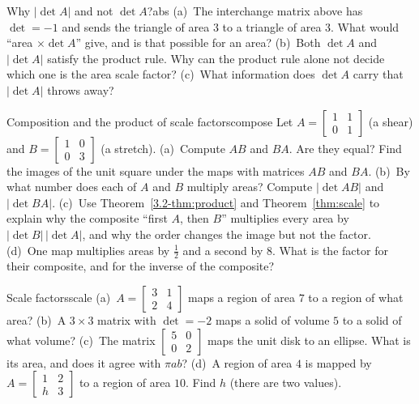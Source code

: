 \documentclass[11pt]{article}
\begin{document}
\begin{think}{Why $|\det A|$ and not $\det A$?}{abs}
(a)~The interchange matrix above has $\det=-1$ and sends the triangle of area $3$ to a triangle of area $3$. What would ``area $\times\det A$'' give, and is that possible for an area? (b)~Both $\det A$ and $|\det A|$ satisfy the product rule. Why can the product rule alone not decide which one is the area scale factor? (c)~What information does $\det A$ carry that $|\det A|$ throws away?
\end{think}

\begin{think}{Composition and the product of scale factors}{compose}
Let $A=\begin{bmatrix}1&1\\0&1\end{bmatrix}$ (a shear) and $B=\begin{bmatrix}1&0\\0&3\end{bmatrix}$ (a stretch). (a)~Compute $AB$ and $BA$. Are they equal? Find the images of the unit square under the maps with matrices $AB$ and $BA$. (b)~By what number does each of $A$ and $B$ multiply areas? Compute $|\det AB|$ and $|\det BA|$. (c)~Use Theorem~\ref{3.2-thm:product} and Theorem~\ref{thm:scale} to explain why the composite ``first $A$, then $B$'' multiplies every area by $|\det B|\,|\det A|$, and why the order changes the image but not the factor. (d)~One map multiplies areas by $\tfrac12$ and a second by $8$. What is the factor for their composite, and for the inverse of the composite?
\end{think}

\begin{kc}{Scale factors}{scale}
(a)~$A=\begin{bmatrix}3&1\\2&4\end{bmatrix}$ maps a region of area $7$ to a region of what area? (b)~A $3\times3$ matrix with $\det=-2$ maps a solid of volume $5$ to a solid of what volume? (c)~The matrix $\begin{bmatrix}5&0\\0&2\end{bmatrix}$ maps the unit disk to an ellipse. What is its area, and does it agree with $\pi ab$? (d)~A region of area $4$ is mapped by $A=\begin{bmatrix}1&2\\h&3\end{bmatrix}$ to a region of area $10$. Find $h$ (there are two values).
\end{kc}
\end{document}
